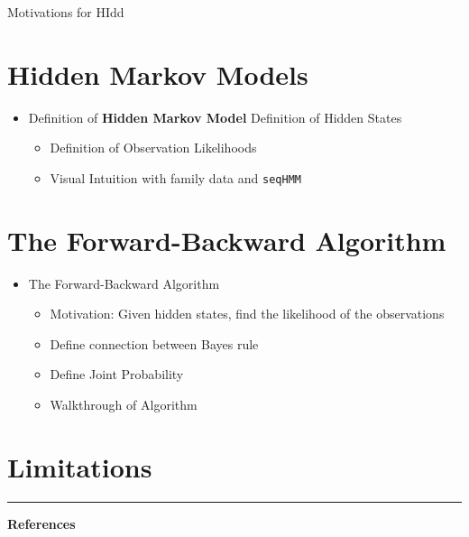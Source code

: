 \documentclass[
]{book}
\providecommand{\tightlist}{%
  \setlength{\itemsep}{0pt}\setlength{\parskip}{0pt}}
\begin{document}
Motivations for HIdd

\hypertarget{hidden-markov-models-1}{%
\section{Hidden Markov Models}\label{hidden-markov-models-1}}

\begin{itemize}
\tightlist
\item
  Definition of \textbf{Hidden Markov Model}
  Definition of Hidden States

  \begin{itemize}
  \tightlist
  \item
    Definition of Observation Likelihoods
  \item
    Visual Intuition with family data and \texttt{seqHMM}
  \end{itemize}
\end{itemize}

\hypertarget{the-forward-backward-algorithm}{%
\section{The Forward-Backward Algorithm}\label{the-forward-backward-algorithm}}

\begin{itemize}
\tightlist
\item
  The Forward-Backward Algorithm

  \begin{itemize}
  \tightlist
  \item
    Motivation: Given hidden states, find the likelihood of the observations
  \item
    Define connection between Bayes rule
  \item
    Define Joint Probability
  \item
    Walkthrough of Algorithm
  \end{itemize}
\end{itemize}

\hypertarget{limitations}{%
\section{Limitations}\label{limitations}}

\begin{center}\rule{0.5\linewidth}{0.5pt}\end{center}

\textbf{References}
\end{document}
